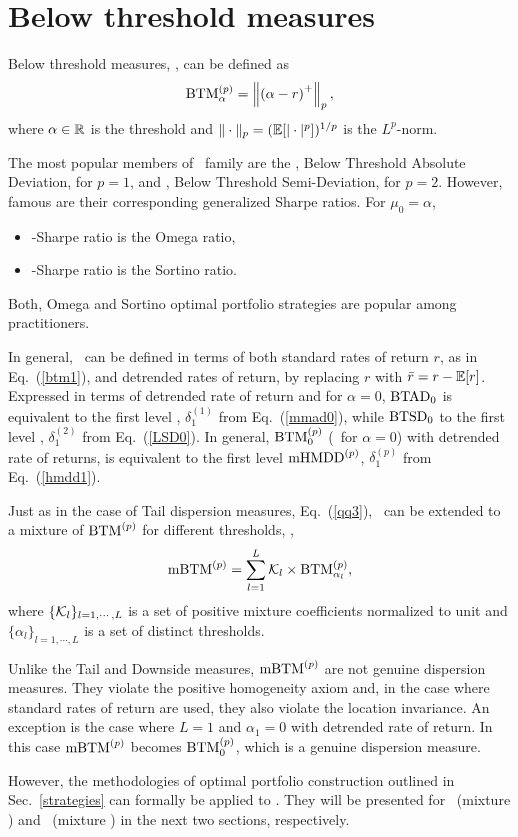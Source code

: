 
\section{Below threshold measures}
Below threshold measures, \BTM, can be defined as
\begin{equation}
    \BTM^{(p)}_\alpha = \left\| \left(\alpha - r\right)^+ \right\|_p,
    \label{btm1}
\end{equation}
where $\alpha \in {\mathbb R}$ is the threshold and $\|\cdot\|_p = ({\mathbb E}[|\cdot|^p])^{1/p}$ is the $L^p$-norm.

The most popular members of \BTM\ family are the \BTAD, Below Threshold Absolute Deviation, for $p=1$, and
\BTSD, Below Threshold Semi-Deviation, for $p=2$. However, famous are their corresponding generalized Sharpe ratios.
For $\mu_0=\alpha$,
\begin{itemize}
  \item \BTAD-Sharpe ratio is the Omega ratio,
  \item \BTSD-Sharpe ratio  is the Sortino ratio.
\end{itemize}
Both, Omega and Sortino optimal portfolio strategies are popular among practitioners.

In general, \BTM\ can be defined in terms of both standard rates of return $r$, as in Eq.~(\ref{btm1}), and
detrended rates of return, by replacing $r$ with ${\bar r} = r - {\mathbb E}[r]$.
Expressed in terms of detrended rate of return and for $\alpha=0$, ${\rm BTAD}_0$ is equivalent to the first level \mMAD, $\delta^{(1)}_1$ from Eq.~(\ref{mmad0}),
while ${\rm BTSD}_0$ to the first level \mLSD, $\delta^{(2)}_1$ from Eq.~(\ref{LSD0}). In general, ${\rm BTM}^{(p)}_0$ (\ie\ for $\alpha=0$) with detrended rate of returns,
is equivalent to the first level ${\rm mHMDD}^{(p)}$, $\delta^{(p)}_1$ from Eq.~(\ref{hmdd1}).

Just as in the case of Tail dispersion measures, Eq.~(\ref{qq3}), \BTM\ can be extended to a mixture of ${\rm BTM}^{(p)}$ for different thresholds, \ie,
\begin{equation}
    \mBTM^{(p)} = \sum_{l=1}^L \cK_l \times \BTM^{(p)}_{\alpha_l},
    \label{btm2}
\end{equation}
where $\{{\cal K}_l\}_{l=1,\cdots,L}$ is a set of positive mixture coefficients normalized to unit and
$\{\alpha_l\}_{l=1,\cdots,L}$ is a set of distinct thresholds.

Unlike the Tail and Downside measures, ${\rm mBTM}^{(p)}$ are not genuine dispersion measures.
They violate the positive homogeneity axiom and, in the case where standard rates of return are used, they also violate the location invariance.
An exception is the case where $L=1$ and $\alpha_1=0$ with detrended rate of return.
In this case ${\rm mBTM}^{(p)}$ becomes ${\rm BTM}^{(p)}_0$, which is a genuine dispersion measure.

However, the methodologies of optimal portfolio construction outlined in Sec.~\ref{strategies} can formally be applied to \mBTM.
They will be presented for \mBTAD\ (mixture \BTAD) and \mBTSD\ (mixture \BTSD) in the next two sections, respectively.

\BackToContents


 